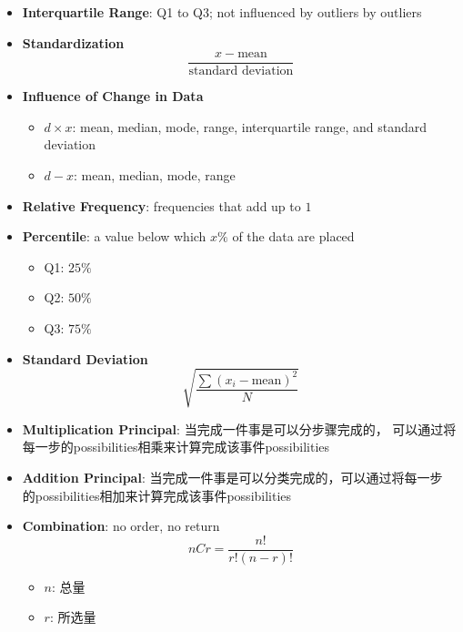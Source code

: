 \begin{multicols}{2}
\begin{itemize}
    \item \textbf{Interquartile Range}: Q1 to Q3; not influenced by outliers
    by outliers

    \item \textbf{Standardization}
    \begin{equation}
      \frac{x - \text{mean}}{\text{standard deviation}}
    \end{equation}

    \item \textbf{Influence of Change in Data}
    \begin{itemize}
      \item $ d \times x $: mean, median, mode, range, interquartile range,
      and standard deviation
      \item $ d - x $: mean, median, mode, range
    \end{itemize}

    \item \textbf{Relative Frequency}: frequencies that add up to $ 1 $
    \item \textbf{Percentile}: a value below which $ x \% $ of the data are
    placed
    \begin{itemize}
      \item Q1: $ 25\% $
      \item Q2: $ 50\% $
      \item Q3: $ 75\% $
    \end{itemize}

    \item \textbf{Standard Deviation}
    \begin{equation}
      \sqrt{\frac{\sum \left( x_{i} - \text{mean} \right)^{2}}{N}}
    \end{equation}

    \item \textbf{Multiplication Principal}: 当完成一件事是可以分步骤完成的，
    可以通过将每一步的possibilities相乘来计算完成该事件possibilities
    \item \textbf{Addition Principal}: 当完成一件事是可以分类完成的，可以通过将每一步
    的possibilities相加来计算完成该事件possibilities

    \item \textbf{Combination}: no order, no return
    \begin{equation}
      n C r = \frac{n!}{r! \left( n - r \right)!}
    \end{equation}
    \begin{itemize}
      \item $ n $: 总量
      \item $ r $: 所选量
    \end{itemize}


\end{itemize}
\end{multicols}
